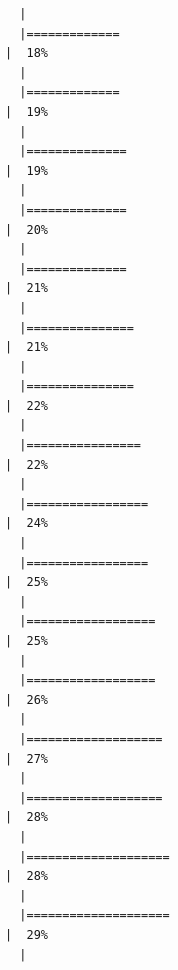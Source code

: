\documentclass[
  letterpaper,
  DIV=11,
  numbers=noendperiod]{scrreprt}
\begin{document}
\begin{verbatim}
  |                                                                            
  |=============                                                         |  18%
  |                                                                            
  |=============                                                         |  19%
  |                                                                            
  |==============                                                        |  19%
  |                                                                            
  |==============                                                        |  20%
  |                                                                            
  |==============                                                        |  21%
  |                                                                            
  |===============                                                       |  21%
  |                                                                            
  |===============                                                       |  22%
  |                                                                            
  |================                                                      |  22%
  |                                                                            
  |=================                                                     |  24%
  |                                                                            
  |=================                                                     |  25%
  |                                                                            
  |==================                                                    |  25%
  |                                                                            
  |==================                                                    |  26%
  |                                                                            
  |===================                                                   |  27%
  |                                                                            
  |===================                                                   |  28%
  |                                                                            
  |====================                                                  |  28%
  |                                                                            
  |====================                                                  |  29%
  |                                                                            

\end{verbatim}
\end{document}
